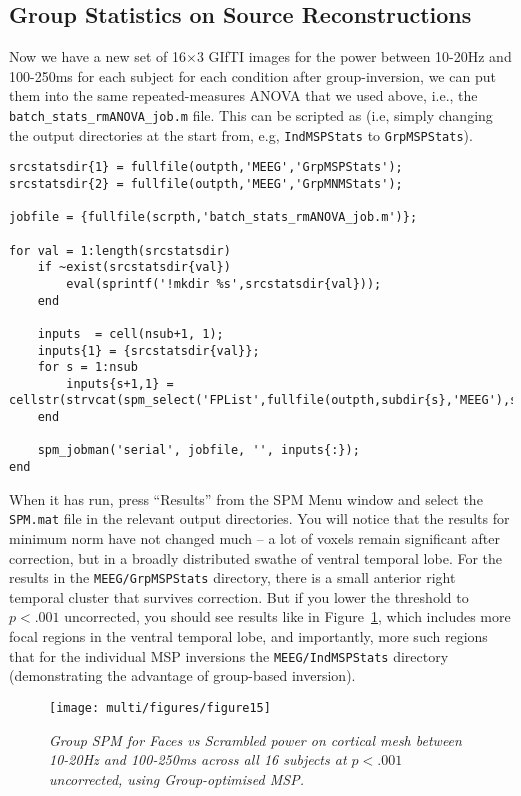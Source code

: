 \subsection{Group Statistics on Source Reconstructions}

Now we have a new set of 16\(\times\)3 GIfTI images for the power between 10-20Hz and 100-250ms for each subject for each condition after group-inversion, we can put them into the same repeated-measures ANOVA that we used above, i.e., the \texttt{batch\_stats\_rmANOVA\_job.m} file. This can be scripted as (i.e, simply changing the output directories at the start from, e.g, \texttt{IndMSPStats} to \texttt{GrpMSPStats}).

\begin{lstlisting}[style=Matlab-editor,basicstyle=\mlttfamily\footnotesize]
srcstatsdir{1} = fullfile(outpth,'MEEG','GrpMSPStats');
srcstatsdir{2} = fullfile(outpth,'MEEG','GrpMNMStats');

jobfile = {fullfile(scrpth,'batch_stats_rmANOVA_job.m')};

for val = 1:length(srcstatsdir)
    if ~exist(srcstatsdir{val})
        eval(sprintf('!mkdir %s',srcstatsdir{val}));
    end
    
    inputs  = cell(nsub+1, 1);    
    inputs{1} = {srcstatsdir{val}};    
    for s = 1:nsub
        inputs{s+1,1} = cellstr(strvcat(spm_select('FPList',fullfile(outpth,subdir{s},'MEEG'),sprintf('^apMcbdspmeeg_run_01_sss_%d.*\.gii',val))));   
    end
    
    spm_jobman('serial', jobfile, '', inputs{:});
end
\end{lstlisting}

When it has run, press ``Results'' from the SPM Menu window and select the \texttt{SPM.mat} file in the relevant output directories. You will notice that the results for minimum norm have not changed much -- a lot of voxels remain significant after correction, but in a broadly distributed swathe of ventral temporal lobe. For the results in the \texttt{MEEG/GrpMSPStats} directory, there is a small anterior right temporal cluster that survives correction. But if you lower the threshold to \(p<.001\) uncorrected, you should see results like in Figure~\ref{multi:fig:15}, which includes more focal regions in the ventral temporal lobe, and importantly, more such regions that for the individual MSP inversions the \texttt{MEEG/IndMSPStats} directory (demonstrating the advantage of group-based inversion).

\begin{figure}
\begin{center}
\texttt{[image: multi/figures/figure15]}
\caption{\em Group SPM for Faces vs Scrambled power on cortical mesh between 10-20Hz and 100-250ms  across all 16 subjects at \(p<.001\)uncorrected, using Group-optimised MSP. \label{multi:fig:15}}
\end{center}
\end{figure}

